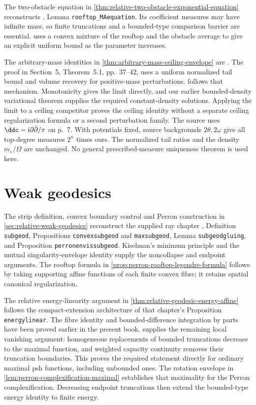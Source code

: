 The two-obstacle equation in \cref{thm:relative-two-obstacle-exponential-equation} reconstructs \cite{XiaSampleBook}, Lemma \texttt{rooftop\_MAequation}. Its coefficient measures may have infinite mass, so finite truncations and a bounded-type comparison barrier are essential.  uses a convex mixture of the rooftop and the obstacle average to give an explicit uniform bound as the parameter increases.

The arbitrary-mass identities in \cref{thm:arbitrary-mass-ceiling-envelope} are \cite[Theorem 1.2, p.~4]{PSWZ26}. The proof in Section~5, Theorem~5.1, pp.~37--42, uses a uniform normalized tail bound and volume recovery for positive-mass perturbations.  follows that mechanism. Monotonicity gives the limit directly, and our earlier bounded-density variational theorem supplies the required constant-density solutions. Applying the limit to a ceiling competitor proves the ceiling identity without a separate ceiling regularization formula or a second perturbation family. The source uses $\ddc=\mathrm i\partial\bar\partial/\pi$ on p.~7. With potentials fixed, source backgrounds $2\theta,2\omega$ give all top-degree measures $2^n$ times ours. The normalized tail ratios and the density $m_\varepsilon/\Omega$ are unchanged. No general prescribed-measure uniqueness theorem is used here.

\section{Weak geodesics}\label{sec:history-weak-geodesics}
The strip definition, convex boundary control and Perron construction in \cref{sec:relative-weak-geodesics} reconstruct the supplied ray chapter \cite{XiaSampleBook}, Definition \texttt{subgeod}, Propositions \texttt{convexsubgeod} and \texttt{maxsubgeod}, Lemma \texttt{subgeodgluing}, and Proposition \texttt{perronenvissubgeod}. Kiselman's minimum principle and the mutual singularity-envelope identity supply the noncollapse and endpoint arguments. The rooftop formula in \cref{prop:perron-rooftop-legendre-formula} follows by taking supporting affine functions of each finite convex fibre; it retains spatial canonical regularization.

The relative energy-linearity argument in \cref{thm:relative-geodesic-energy-affine} follows the compact-extension architecture of that chapter's Proposition \texttt{energylinear}. The fibre identity and bounded-difference integration by parts have been proved earlier in the present book.  supplies the remaining local vanishing argument: homogeneous replacements of bounded truncations decrease to the maximal function, and weighted capacity continuity removes their truncation boundaries. This proves the required statement directly for ordinary maximal psh functions, including unbounded ones. The rotation envelope in \cref{lem:perron-complexification-maximal} establishes that maximality for the Perron complexification. Decreasing endpoint truncations then extend the bounded-type energy identity to finite energy.

